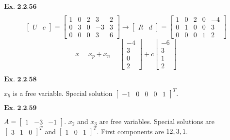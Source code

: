 \documentclass{article}
\begin{document}
\vspace{0.2in}
${\textbf{Ex. 2.2.56}}$

$$
\begin{bmatrix}U & c\end{bmatrix} = \begin{bmatrix}1&0&2&3&2 \\ 0&3&0&-3&3\\0&0&0&3&6\end{bmatrix} \rightarrow \begin{bmatrix}R & d\end{bmatrix} = \begin{bmatrix}1&0&2&0&-4 \\ 0&1&0&0&3\\0&0&0&1&2\end{bmatrix}
$$
$$
x = x_p+x_n = \begin{bmatrix}-4\\3\\0\\2\end{bmatrix} + c\begin{bmatrix}-6\\3\\1\\2\end{bmatrix}
$$

\vspace{0.2in}

\vspace{0.2in}
${\textbf{Ex. 2.2.58}}$

$x_5$ is a free variable. Special solution $\begin{bmatrix}-1&0&0&0&1\end{bmatrix}^T$.

\vspace{0.2in}
${\textbf{Ex. 2.2.59}}$

$A = \begin{bmatrix}1&-3&-1\end{bmatrix}$. $x_2$ and $x_3$ are free variables. Special solutions are $\begin{bmatrix}3&1&0\end{bmatrix}^T$ and $\begin{bmatrix}1&0&1\end{bmatrix}^T$. First components are $12,3,1$.

\vspace{0.2in}

\vspace{0.2in}

\vspace{0.2in}
\end{document}
